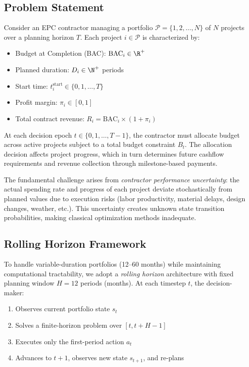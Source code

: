 \subsection{Problem Statement}

Consider an EPC contractor managing a portfolio $\mathcal{P} = \{1, 2, \ldots, N\}$ of $N$ projects over a planning horizon $T$. Each project $i \in \mathcal{P}$ is characterized by:

\begin{itemize}
    \item Budget at Completion (BAC): $\text{BAC}_i \in \R^+$
    \item Planned duration: $D_i \in \N^+$ periods
    \item Start time: $t_i^{\text{start}} \in \{0, 1, \ldots, T\}$
    \item Profit margin: $\pi_i \in [0, 1]$
    \item Total contract revenue: $R_i = \text{BAC}_i \times (1 + \pi_i)$
\end{itemize}

At each decision epoch $t \in \{0, 1, \ldots, T-1\}$, the contractor must allocate budget across active projects subject to a total budget constraint $B_t$. The allocation decision affects project progress, which in turn determines future cashflow requirements and revenue collection through milestone-based payments.

The fundamental challenge arises from \textit{contractor performance uncertainty}: the actual spending rate and progress of each project deviate stochastically from planned values due to execution risks (labor productivity, material delays, design changes, weather, etc.). This uncertainty creates unknown state transition probabilities, making classical optimization methods inadequate.

\subsection{Rolling Horizon Framework}

To handle variable-duration portfolios (12--60 months) while maintaining computational tractability, we adopt a \textit{rolling horizon} architecture with fixed planning window $H = 12$ periods (months). At each timestep $t$, the decision-maker:

\begin{enumerate}
    \item Observes current portfolio state $s_t$
    \item Solves a finite-horizon problem over $[t, t+H-1]$
    \item Executes only the first-period action $a_t$
    \item Advances to $t+1$, observes new state $s_{t+1}$, and re-plans
\end{enumerate}

